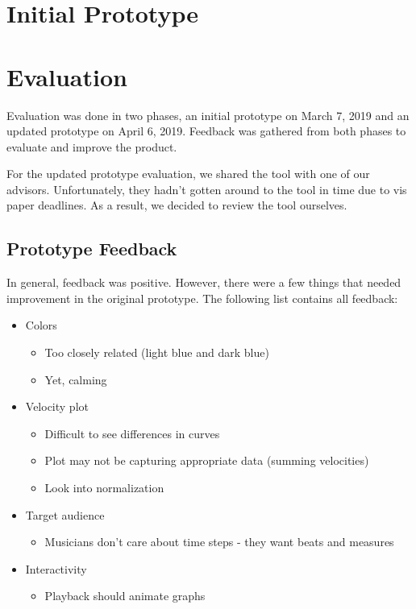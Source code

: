 \documentclass[journal]{vgtc}                %
\begin{document}
\section{Initial Prototype}

\section{Evaluation}

Evaluation was done in two phases, an initial prototype on March 7, 2019 and an
updated prototype on April 6, 2019. Feedback was gathered from both phases to
evaluate and improve the product.

For the updated prototype evaluation, we shared the tool with one of our advisors.
Unfortunately, they hadn’t gotten around to the tool in time due to vis paper
deadlines. As a result, we decided to review the tool ourselves.

\subsection{Prototype Feedback}

In general, feedback was positive. However, there were a few things
that needed improvement in the original prototype. The following
list contains all feedback:

\begin{itemize}
  \item Colors
  \begin{itemize}
    \item Too closely related (light blue and dark blue)
    \item Yet, calming
  \end{itemize}
  \item Velocity plot
  \begin{itemize}
    \item Difficult to see differences in curves
    \item Plot may not be capturing appropriate data (summing velocities)
    \item Look into normalization
  \end{itemize}
  \item Target audience
  \begin{itemize}
    \item Musicians don't care about time steps - they want beats and measures
  \end{itemize}
  \item Interactivity
  \begin{itemize}
    \item Playback should animate graphs
  \end{itemize}
\end{itemize}
\end{document}
